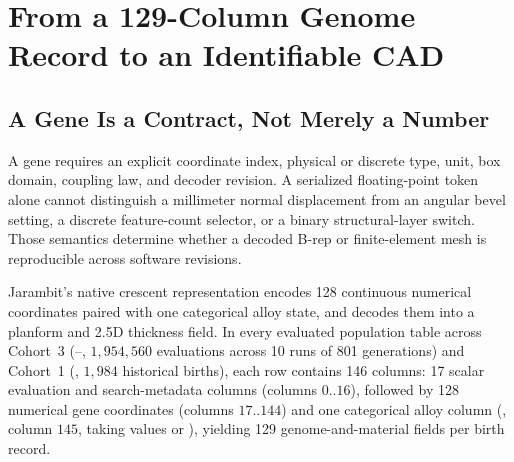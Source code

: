 \section{From a 129-Column Genome Record to an Identifiable CAD}
\label{sec:genome}

\subsection{A Gene Is a Contract, Not Merely a Number}
A gene requires an explicit coordinate index, physical or discrete type, unit, box domain, coupling law, and decoder revision. A serialized floating-point token alone cannot distinguish a millimeter normal displacement from an angular bevel setting, a discrete feature-count selector, or a binary structural-layer switch. Those semantics determine whether a decoded B-rep or finite-element mesh is reproducible across software revisions.

Jarambit's native crescent representation encodes 128 continuous numerical coordinates paired with one categorical alloy state, and decodes them into a planform and 2.5D thickness field. In every evaluated population table across Cohort~3 (--, $1{,}954{,}560$ evaluations across 10 runs of 801 generations) and Cohort~1 (, $1{,}984$ historical births), each row contains 146 columns: 17 scalar evaluation and search-metadata columns (columns $0..16$), followed by 128 numerical  gene coordinates (columns $17..144$) and one categorical alloy column (, column $145$, taking values  or ), yielding 129 genome-and-material fields per birth record.


